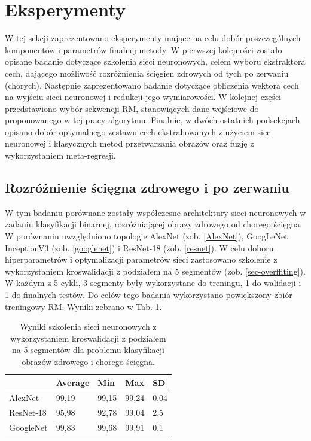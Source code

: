 \section{Eksperymenty}

W tej sekcji zaprezentowano eksperymenty mające na celu dobór poszczególnych komponentów i parametrów finalnej metody. W pierwszej kolejności zostało opisane badanie dotyczące szkolenia sieci neuronowych, celem wyboru ekstraktora cech, dającego możliwość rozróżnienia ścięgien zdrowych od tych po zerwaniu (chorych). Następnie zaprezentowano badanie dotyczące obliczenia wektora cech na wyjściu sieci neuronowej i redukcji jego wymiarowości. W kolejnej części przedstawiono wybór sekwencji RM, stanowiących dane wejściowe do proponowanego w tej pracy algorytmu. Finalnie, w dwóch ostatnich podsekcjach opisano dobór optymalnego zestawu cech ekstrahowanych z użyciem sieci neuronowej i klasycznych metod przetwarzania obrazów oraz fuzję z wykorzystaniem meta-regresji.  


\subsection{Rozróżnienie ścięgna zdrowego i po zerwaniu}
\label{binaryMRI}
W tym badaniu porównane zostały współczesne architektury sieci neuronowych w zadaniu klasyfikacji binarnej, rozróżniającej obrazy zdrowego od chorego ścięgna. W porównaniu uwzględniono topologie AlexNet (zob. \ref{AlexNet}), GoogLeNet InceptionV3 (zob. \ref{googlenet}) i ResNet-18 (zob. \ref{resnet}). W celu doboru hiperparametrów i optymalizacji parametrów sieci zastosowano szkolenie z wykorzystaniem kroswalidacji z podziałem na 5 segmentów (zob. \ref{sec-overffiting}). W każdym z 5 cykli, 3 segmenty były wykorzystane do treningu, 1 do walidacji i 1 do finalnych testów. Do celów tego badania wykorzystano powiększony zbiór treningowy RM. Wyniki zebrano w Tab. \ref{tab:binary-cross-validation}.
\begin{table}[h!]
	\setlength{\tabcolsep}{14pt}
	\centering
	\caption{Wyniki szkolenia sieci neuronowych z wykorzystaniem kroswalidacji z podziałem na 5 segmentów dla problemu klasyfikacji obrazów zdrowego i chorego ścięgna.}
	\label{tab:binary-cross-validation}
	\begin{tabular}{l | l | l | l | l }
		 & Average   & Min   & Max   & SD   \\ \hline \hline
		AlexNet   & 99,19 & 99,15 & 99,24 & 0,04 \\ \hline
		ResNet-18 & 95,98 & 92,78 & 99,04 & 2,5  \\ \hline
		GoogleNet & 99,83 & 99,68 & 99,91 & 0,1  \\ %
	\end{tabular}
\end{table}

